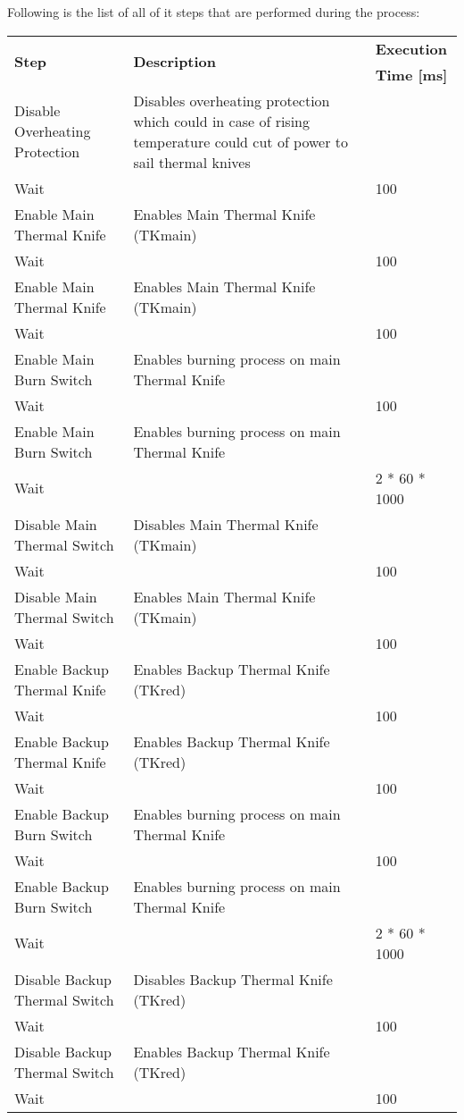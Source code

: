Following is the list of all of it steps that are performed during the process:

\begin{longtable}{l|m{5cm}|l}
    \toprule
    \multirow{2}{*}{\textbf{Step}} & \multirow{2}{*}{\textbf{Description}} & \textbf{Execution} \\
    & & \textbf{Time [ms]} \\
    \midrule
    \endhead
    Disable Overheating Protection & Disables overheating protection which could in case of rising temperature could cut of power to sail thermal knives & \\\hline
    Wait & & 100 \\\hline
    Enable Main Thermal Knife & Enables Main Thermal Knife (TKmain) & \\\hline
    Wait & & 100 \\\hline
    Enable Main Thermal Knife & Enables Main Thermal Knife (TKmain) & \\\hline
    Wait & & 100 \\\hline
    Enable Main Burn Switch & Enables burning process on main Thermal Knife & \\\hline
    Wait & & 100 \\\hline
    Enable Main Burn Switch & Enables burning process on main Thermal Knife & \\\hline
    Wait & & 2 * 60 * 1000 \\\hline
    Disable Main Thermal Switch & Disables Main Thermal Knife (TKmain) & \\\hline
    Wait & & 100 \\\hline
    Disable Main Thermal Switch & Enables Main Thermal Knife (TKmain) & \\\hline
    Wait & & 100 \\\hline
    Enable Backup Thermal Knife & Enables Backup Thermal Knife (TKred) & \\\hline
    Wait & & 100 \\\hline
    Enable Backup Thermal Knife & Enables Backup Thermal Knife (TKred) & \\\hline
    Wait & & 100 \\\hline
    Enable Backup Burn Switch & Enables burning process on main Thermal Knife & \\\hline
    Wait & & 100 \\\hline
    Enable Backup Burn Switch & Enables burning process on main Thermal Knife & \\\hline
    Wait & & 2 * 60 * 1000 \\\hline
    Disable Backup Thermal Switch & Disables Backup Thermal Knife (TKred) & \\\hline
    Wait & & 100 \\\hline
    Disable Backup Thermal Switch & Enables Backup Thermal Knife (TKred) & \\\hline
    Wait & & 100 \\
    \bottomrule
\end{longtable}

